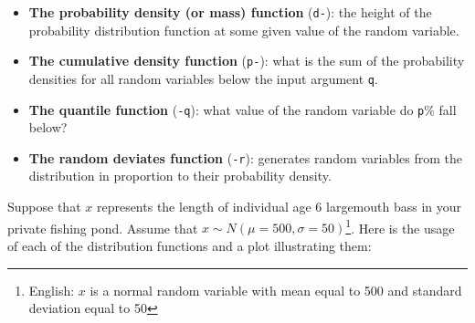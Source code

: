 \documentclass[]{book}
\providecommand{\tightlist}{%
  \setlength{\itemsep}{0pt}\setlength{\parskip}{0pt}}
\let\rmarkdownfootnote\footnote%
\def\footnote{\protect\rmarkdownfootnote}
\theoremstyle{definition}
\theoremstyle{definition}
\theoremstyle{definition}
\theoremstyle{remark}
\begin{document}
\begin{itemize}
\tightlist
\item
  \textbf{The probability density (or mass) function} (\texttt{d-}): the
  height of the probability distribution function at some given value of
  the random variable.
\item
  \textbf{The cumulative density function} (\texttt{p-}): what is the
  sum of the probability densities for all random variables below the
  input argument \texttt{q}.
\item
  \textbf{The quantile function} (\texttt{-q}): what value of the random
  variable do \texttt{p}\% fall below?
\item
  \textbf{The random deviates function} (\texttt{-r}): generates random
  variables from the distribution in proportion to their probability
  density.
\end{itemize}

Suppose that \(x\) represents the length of individual age 6 largemouth
bass in your private fishing pond. Assume that
\(x \sim N(\mu=500, \sigma=50)\)\footnote{English: \(x\) is a normal
  random variable with mean equal to 500 and standard deviation equal to
  50}. Here is the usage of each of the distribution functions and a
plot illustrating them:
\end{document}
